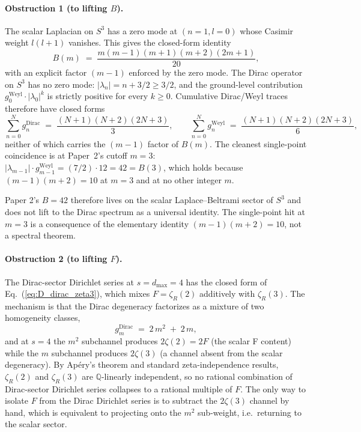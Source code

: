 \documentclass[aps,prl,twocolumn,superscriptaddress]{revtex4-2}
\begin{document}
\paragraph{Obstruction 1 (to lifting $B$).}
The scalar Laplacian on $S^3$ has a zero mode at $(n=1, l=0)$ whose
Casimir weight $l(l+1)$ vanishes. This gives the closed-form identity
\begin{equation}\label{eq:Bclosed_repeat}
  B(m) \;=\; \frac{m(m-1)(m+1)(m+2)(2m+1)}{20},
\end{equation}
with an explicit factor $(m-1)$ enforced by the zero mode. The Dirac
operator on $S^3$ has no zero mode: $|\lambda_n| = n+3/2 \geq 3/2$, and
the ground-level contribution $g_0^{\text{Weyl}}\cdot|\lambda_0|^k$ is
strictly positive for every $k \geq 0$. Cumulative Dirac/Weyl traces
therefore have closed forms
\begin{equation}
  \sum_{n=0}^{N} g_n^{\text{Dirac}}
  \;=\; \frac{(N+1)(N+2)(2N+3)}{3},
  \qquad
  \sum_{n=0}^{N} g_n^{\text{Weyl}}
  \;=\; \frac{(N+1)(N+2)(2N+3)}{6},
\end{equation}
neither of which carries the $(m-1)$ factor of $B(m)$. The cleanest
single-point coincidence is at Paper~2's cutoff $m=3$:
$|\lambda_{m-1}|\cdot g_{m-1}^{\text{Weyl}} = (7/2)\cdot 12 = 42 = B(3)$,
which holds because $(m-1)(m+2) = 10$ at $m=3$ and at no other integer
$m$.

Paper 2's $B = 42$ therefore lives on the scalar Laplace--Beltrami
sector of $S^3$ and does not lift to the Dirac spectrum as a universal
identity. The single-point hit at $m=3$ is a consequence of the
elementary identity $(m-1)(m+2) = 10$, not a spectral theorem.

\paragraph{Obstruction 2 (to lifting $F$).}
The Dirac-sector Dirichlet series at $s = d_{\max}=4$ has the closed
form of Eq.~(\ref{eq:D_dirac_zeta3}), which mixes $F = \zeta_R(2)$
additively with $\zeta_R(3)$. The mechanism is that the Dirac degeneracy
factorizes as a mixture of two homogeneity classes,
\begin{equation}
  g_m^{\text{Dirac}} \;=\; 2\,m^2 \;+\; 2\,m,
\end{equation}
and at $s = 4$ the $m^2$ subchannel produces $2\zeta(2) = 2F$ (the
scalar F content) while the $m$ subchannel produces $2\zeta(3)$ (a
channel absent from the scalar degeneracy). By Apéry's theorem and
standard zeta-independence results, $\zeta_R(2)$ and $\zeta_R(3)$ are
$\mathbb{Q}$-linearly independent, so no rational combination of
Dirac-sector Dirichlet series collapses to a rational multiple of $F$.
The only way to isolate $F$ from the Dirac Dirichlet series is to
subtract the $2\zeta(3)$ channel by hand, which is equivalent to
projecting onto the $m^2$ sub-weight, i.e.\ returning to the scalar
sector.
\end{document}
